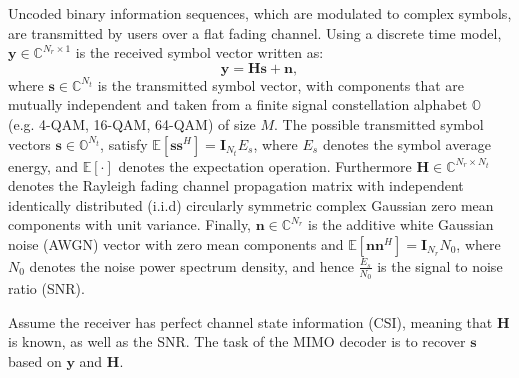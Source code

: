 \documentclass[12pt, draftclsnofoot, onecolumn]{IEEEtran}
\begin{document}
  Uncoded binary information sequences, which are modulated to complex symbols, are transmitted by users over a flat fading channel. Using a discrete time model, $\mathbf{y}\in\mathbb{C}^{N_{r}\times 1}$ is the received symbol vector written as:
\begin{equation}
\mathbf{y}=\mathbf{H}\mathbf{s}+\mathbf{n},   \label{discrete time MIMO system}
\end{equation}
where $\mathbf{s}\in \mathbb{C}^{N_{t}}$ is the transmitted symbol vector, with components that are mutually independent and taken from a finite signal constellation alphabet $\mathbb{O}$ (e.g. 4-QAM, 16-QAM, 64-QAM) of size $M$. The possible transmitted symbol vectors $\mathbf{s}\in \mathbb{O}^{N_{t}}$, satisfy $\mathbb{E}[\mathbf{s}\mathbf{s}^{H}]=\mathbf{I}_{N_t}E_{s}$, where $E_{s}$ denotes the symbol average energy, and $\mathbb{E}[\cdot]$ denotes the expectation operation. Furthermore $\mathbf{H}\in \mathbb{C}^{N_{r}\times N_{t}}$ denotes the Rayleigh fading channel propagation matrix with independent identically distributed (i.i.d) circularly symmetric complex Gaussian zero mean components with unit variance. Finally, $\mathbf{n}\in \mathbb{C}^{N_{r}}$ is the additive white Gaussian noise (AWGN) vector with zero mean components and $\mathbb{E}[\mathbf{n}\mathbf{n}^{H}]=\mathbf{I}_{N_{r}}N_{0}$, where $N_{0}$ denotes the noise power spectrum density, and hence $\frac{E_{s}}{N_{0}}$ is the signal to noise ratio (SNR). 

  Assume the receiver has perfect channel state information (CSI), meaning that $ \mathbf{H}$ is known, as well as the SNR. The task of the MIMO decoder is to recover $\mathbf{s}$ based on $\mathbf{y}$ and $\mathbf{H}$.
\end{document}
